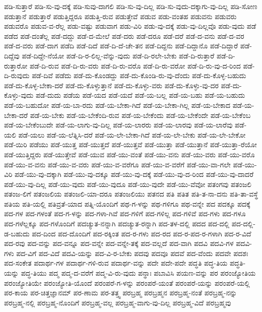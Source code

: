 {ಪಡಿ-ಸುತ್ತಾರೆ
ಪಡಿ-ಸು-ವು-ದಕ್ಕೆ
ಪಡಿ-ಸುವು-ದಾಗಲಿ
ಪಡಿ-ಸು-ವು-ದಿಲ್ಲ
ಪಡಿ-ಸು-ವುದು-ದಕ್ಕಾಗು-ವು-ದಿಲ್ಲ
ಪಡಿ-ಸೋಣ
ಪಡುತ್ತಾನೆ
ಪಡುತ್ತಾರೆ
ಪಡುತ್ತಿದ್ದರೂ
ಪಡುತ್ತಿ-ರುವ
ಪಡುತ್ತೇವೆ
ಪಡುವ
ಪಡು-ವಂತಹ
ಪಡುವನು
ಪಡುವರು
ಪಡುವರೊ
ಪಡುವ-ವ-ರೆಲ್ಲ
ಪಡು-ವಷ್ಟು
ಪಡುವಾಗ
ಪಡು-ವಿರಿ
ಪಡು-ವು-ದಕ್ಕೆ
ಪಡು-ವು-ದಿಲ್ಲವೊ
ಪಡು-ವುದು
ಪಡೆ
ಪಡೆದ
ಪಡೆ-ದಂತೆಲ್ಲ
ಪಡೆ-ದದ್ದು
ಪಡೆ-ದ-ಮೇಲೆ
ಪಡೆ-ದರು
ಪಡೆ-ದರೂ
ಪಡೆ-ದರೆ
ಪಡೆ-ದ-ವನು
ಪಡೆ-ದ-ವರ
ಪಡೆ-ದ-ವರು
ಪಡೆ-ದಾಗ
ಪಡೆದಿ
ಪಡೆ-ದಿದೆ
ಪಡೆ-ದಿ-ದೆ-ಚೇ-ತನ
ಪಡೆ-ದಿದ್ದನು
ಪಡೆ-ದಿದ್ದಾನೊ
ಪಡೆ-ದಿದ್ದಾರೆ
ಪಡೆ-ದಿದ್ದೆವು
ಪಡೆ-ದಿದ್ದೇ-ನೆಯೋ
ಪಡೆ-ದಿ-ರ-ಲಿಲ್ಲ-ವೆನ್ನು-ವುದು
ಪಡೆ-ದಿ-ರಲೇ-ಬೇಕು
ಪಡೆ-ದಿ-ರುತ್ತಾರೆ
ಪಡೆ-ದಿ-ರುತ್ತಾರೋ
ಪಡೆ-ದಿ-ರುವ
ಪಡೆ-ದಿ-ರು-ವರು
ಪಡೆ-ದಿ-ರು-ವರೊ
ಪಡೆ-ದಿ-ರು-ವರೋ
ಪಡೆ-ದಿ-ರು-ವು-ದ-ರಿಂದ
ಪಡೆ-ದಿ-ರುವುದು
ಪಡೆ-ದಿವೆ
ಪಡೆದು
ಪಡೆ-ದು-ಕೊಂಡದ್ದು
ಪಡೆ-ದು-ಕೊಂಡಿ-ರು-ವು-ದೆಂದು
ಪಡೆ-ದು-ಕೊಳ್ಳ-ಬಹುದು
ಪಡೆ-ದು-ಕೊಳ್ಳ-ಬೇಕಾ-ದರೆ
ಪಡೆ-ದು-ಕೊಳ್ಳುತ್ತಾನೆ
ಪಡೆ-ದು-ಕೊಳ್ಳು-ವರು
ಪಡೆ-ದು-ಕೊಳ್ಳು-ವು-ದರ
ಪಡೆ-ದು-ಕೊಳ್ಳು-ವುದು
ಪಡೆ-ದುದು
ಪಡೆಯ
ಪಡೆ-ಯದ
ಪಡೆ-ಯದೆ
ಪಡೆ-ಯ-ಬಲ್ಲ
ಪಡೆ-ಯ-ಬಹು
ಪಡೆ-ಯ-ಬಹುದು
ಪಡೆ-ಯ-ಬಹುದೋ
ಪಡೆ-ಯ-ಬಾ-ರದು
ಪಡೆ-ಯ-ಬೇಕಾ-ಗಿದೆ
ಪಡೆ-ಯ-ಬೇಕಾ-ಗಿಲ್ಲ
ಪಡೆ-ಯ-ಬೇಕಾದ
ಪಡೆ-ಯ-ಬೇಕಾ-ದರೆ
ಪಡೆ-ಯ-ಬೇಕು
ಪಡೆ-ಯ-ಬೇಕೆಂದಿ-ರುವ
ಪಡೆ-ಯ-ಬೇಕೆಂದು
ಪಡೆ-ಯ-ಬೇಕೆಂದೇ
ಪಡೆ-ಯ-ಬೇಕೆಂಬ
ಪಡೆ-ಯ-ಬೇಕೆಂಬುದೇ
ಪಡೆ-ಯ-ಲಾಗು-ವು-ದಿಲ್ಲ
ಪಡೆ-ಯ-ಲಾರರು
ಪಡೆ-ಯ-ಲಾರವು
ಪಡೆ-ಯ-ಲಾರೆವು
ಪಡೆ-ಯಲಿ
ಪಡೆ-ಯಲು
ಪಡೆ-ಯ-ಲೆತ್ನಿಸಿ-ದರೆ
ಪಡೆ-ಯ-ಲೇ-ಬೇಕಾ-ಗಿದೆ
ಪಡೆ-ಯ-ಲೇ-ಬೇಕು
ಪಡೆ-ಯ-ಲೇ-ಬೇಕೋ
ಪಡೆ-ಯಿರಿ
ಪಡೆಯು
ಪಡೆ-ಯುತ್ತ
ಪಡೆ-ಯುತ್ತದೆ
ಪಡೆ-ಯುತ್ತವೆ
ಪಡೆ-ಯುತ್ತಾ
ಪಡೆ-ಯುತ್ತಾನೆ
ಪಡೆ-ಯುತ್ತಾ-ರೆಯೋ
ಪಡೆ-ಯುತ್ತಿದ್ದರು
ಪಡೆ-ಯುತ್ತೇವೆ
ಪಡೆ-ಯುವ
ಪಡೆ-ಯು-ವಂತೆ
ಪಡೆ-ಯು-ವನು
ಪಡೆ-ಯು-ವರು
ಪಡೆ-ಯು-ವರೊ
ಪಡೆ-ಯು-ವ-ವನು
ಪಡೆ-ಯು-ವ-ವರು
ಪಡೆ-ಯು-ವ-ವರೆಗೂ
ಪಡೆ-ಯು-ವ-ವರೆಗೆ
ಪಡೆ-ಯು-ವಾ-ಗಲೇ
ಪಡೆ-ಯು-ವಿರಿ
ಪಡೆ-ಯು-ವು-ದಕ್ಕಾಗಿ
ಪಡೆ-ಯು-ವು-ದಕ್ಕೂ
ಪಡೆ-ಯು-ವು-ದಕ್ಕೆ
ಪಡೆ-ಯು-ವು-ದ-ರಿಂದ
ಪಡೆ-ಯು-ವು-ದಾದರೆ
ಪಡೆ-ಯು-ವು-ದಿಲ್ಲ
ಪಡೆ-ಯು-ವುದು
ಪಡೆ-ಯು-ವುದೂ
ಪಡೆ-ಯು-ವುದೇ
ಪಡೆ-ಯು-ವೆವೋ
ಪತಂಗವು
ಪತಂಜಲಿ
ಪತಂಜ-ಲಿಗೆ
ಪತಂಜಲಿಯ
ಪತಂಜಲಿ-ಯಾ-ದರೂ
ಪತಂಜಲಿಯು
ಪತನದ
ಪತಿ
ಪತಿತ
ಪತಿ-ತ-ನಾ-ದನು
ಪತಿ-ತಾ-ವಸ್ಥೆ
ಪತಿಯ
ಪತಿ-ಯಲ್ಲಿ
ಪತಿವ್ರತೆ-ಯಾದ
ಪತ್ನಿ-ಯೊಂದಿಗೆ
ಪಥ-ಗ-ಳನ್ನು
ಪಥ-ಗಳಿಗೂ
ಪಥ-ವನ್ನೇ
ಪದ
ಪದಕ್ಕೂ
ಪದಕ್ಕೆ
ಪದ-ಗಳ
ಪದ-ಗಳಂತೆ
ಪದ-ಗ-ಳನ್ನು
ಪದ-ಗಳಾ-ಗಿವೆ
ಪದ-ಗಳಿಗೆ
ಪದ-ಗಳಿಲ್ಲ
ಪದ-ಗಳಿವೆ
ಪದ-ಗಳು
ಪದ-ಗಳೂ
ಪದ-ಗಳೆಲ್ಲಕ್ಕೂ
ಪದ-ಗಳೊಂದಿಗೆ
ಪದಚ್ಯುತ-ನನ್ನಾಗಿ
ಪದಚ್ಯುತ-ರನ್ನಾಗಿ
ಪದ-ತಳ-ದಲ್ಲಿ
ಪದದ
ಪದ-ದಲ್ಲಿ
ಪದ-ದಲ್ಲಿ-ಡ-ಬಹುದು
ಪದ-ದಿಂದ
ಪದ-ದೊಂದಿಗೆ
ಪದ-ರಕ್ಕಿಂತ
ಪದ-ರ-ಗಳು
ಪದ-ರದ
ಪದ-ರ-ಪದ-ರ-ಗಳಾಗಿ
ಪದ-ರ-ವಿದೆ
ಪದ-ರವು
ಪದ-ವನ್ನು
ಪದ-ವನ್ನೂ
ಪದ-ವನ್ನೇ
ಪದ-ವನ್ನೇ-ತಕ್ಕೆ
ಪದ-ವಲ್ಲದೆ
ಪದ-ವಾಗಿ
ಪದವಿ
ಪದವಿ-ಗಳ
ಪದವಿ-ಗಳು
ಪದ-ವಿಗೆ
ಪದ-ವಿದೆ
ಪದವಿ-ಯನ್ನು
ಪದ-ವಿ-ರ-ಬೇಕು
ಪದವು
ಪದವೂ
ಪದವೆ
ಪದ-ವೆಂದು
ಪದವೇ
ಪದಶಃ
ಪದ-ಸಂಕೇತ
ಪದಾರ್ಥ-ಗಳ
ಪದಾರ್ಥ-ಗಳಿ-ರುವ
ಪದಾರ್ಥ-ವನ್ನು
ಪದೇ
ಪದೇ-ಪದೇ
ಪದ್ಧತಿ
ಪದ್ಧ-ತಿಯ
ಪದ್ಧತಿ-ಯನ್ನು
ಪದ್ಧ-ತಿಯು
ಪದ್ಮ
ಪದ್ಮ-ದ-ವರೆಗೆ
ಪದ್ಮ-ವಿ-ರು-ವುದು
ಪನ್ಥಾಃ
ಪಬಾವಿಸಿ
ಪಯಣ-ವನ್ನು
ಪರ
ಪರಂಜ್ಯೋತಿಯ
ಪರಂಜ್ಯೋತಿಯೇ
ಪರಂಜ್ಯೋತಿ-ಯೊಂದೆ
ಪರಂಪರೆ-ಗ-ಳನ್ನು
ಪರಂಪರೆ-ಯಂತೆ
ಪರಂಪರೆ-ಯನ್ನು
ಪರಂಪರೆ-ಯಲ್ಲಿ
ಪರ-ಕಾಯ
ಪರ-ಚಿತ್ತಜ್ಞಾನಮ್
ಪರ-ಣಾಮ
ಪರ-ತತ್ತ್ವ
ಪರಬ್ರಹ್ಮ
ಪರಬ್ರಹ್ಮನ
ಪರಬ್ರಹ್ಮ-ನಂತೆ
ಪರಬ್ರಹ್ಮ-ನನ್ನು
ಪರಬ್ರಹ್ಮ-ನಲ್ಲಿ
ಪರಬ್ರಹ್ಮ-ನೊಂದಿಗೆ
ಪರಬ್ರಹ್ಮ-ವಲ್ಲ
ಪರಬ್ರಹ್ಮ-ವಾಗು-ವು-ದಿಲ್ಲ
ಪರಬ್ರಹ್ಮ-ವಿದೆ
ಪರಬ್ರಹ್ಮವು
}
